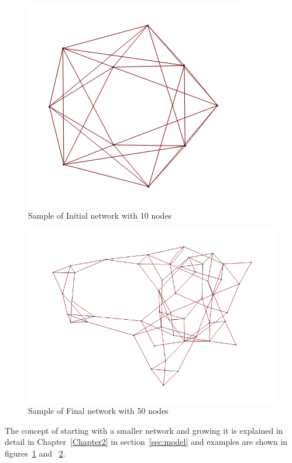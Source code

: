 \begin{figure}
\begin{center}
\includegraphics[scale=0.75]{Figures/network_init}
\end{center}
\caption{Sample of Initial network with 10 nodes}
\label{fig:network_init}
\end{figure}

\begin{figure}
\begin{center}
\includegraphics[scale=0.5]{Figures/network_final}
\end{center}
\caption{Sample of Final network with 50 nodes}
\label{fig:network_final}
\end{figure}

The concept of starting with a smaller network and growing it is explained in detail in Chapter~\ref{Chapter2} in section~\ref{sec:model} and examples are shown in figures~\ref{fig:network_init} and ~\ref{fig:network_final}.

